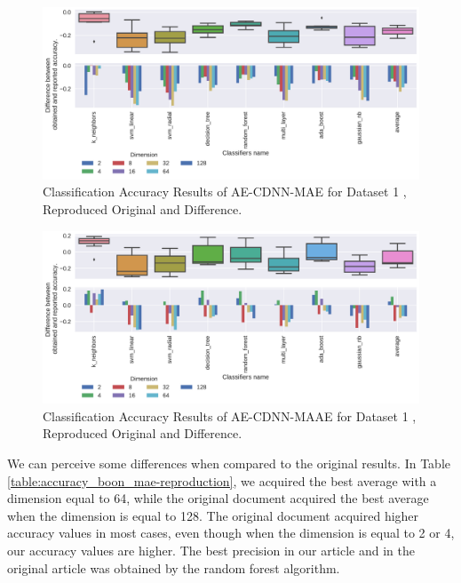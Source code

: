 




\begin{figure}[!ht]
  \centering
  \includegraphics[width=0.8\linewidth]{figure/table_2.pdf}
  \caption{Classification Accuracy Results of AE-CDNN-MAE for Dataset 1 \cite{WenZha:2018}, Reproduced Original and Difference.}
\label{fig:acc-AE-CDNN-MAE-d1}
\end{figure}

\begin{figure}[!ht]
  \centering
  \includegraphics[width=0.8\linewidth]{figure/table_3.pdf}
  \caption{Classification Accuracy Results of AE-CDNN-MAAE for Dataset 1 \cite{WenZha:2018}, Reproduced Original and Difference.}
\label{fig:acc-AE-CDNN-MAAE-d1}
\end{figure}

We can perceive some differences when compared to the original results. In Table \ref{table:accuracy_boon_mae-reproduction}, we acquired the best average with a dimension equal to 64, while the original document acquired the best average when the dimension is equal to 128. The original document acquired higher accuracy values in most cases, even though when the dimension is equal to 2 or 4, our accuracy values are higher. The best precision in our article and in the original article was obtained by the random forest algorithm.




